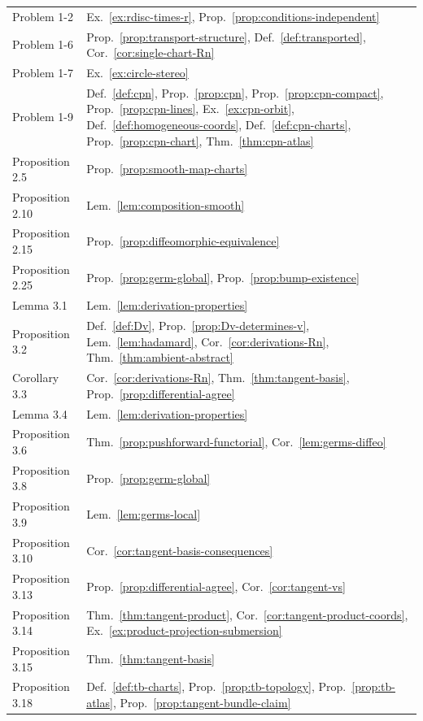 \documentclass[11pt]{report}
\begin{document}
{\begin{longtable}{>{\raggedright\arraybackslash}p{3.6cm} >{\raggedright\arraybackslash}p{11.2cm}}
Problem 1-2 & Ex.~\ref{ex:rdisc-times-r}, Prop.~\ref{prop:conditions-independent} \\
Problem 1-6 & Prop.~\ref{prop:transport-structure}, Def.~\ref{def:transported}, Cor.~\ref{cor:single-chart-Rn} \\
Problem 1-7 & Ex.~\ref{ex:circle-stereo} \\
Problem 1-9 & Def.~\ref{def:cpn}, Prop.~\ref{prop:cpn}, Prop.~\ref{prop:cpn-compact}, Prop.~\ref{prop:cpn-lines}, Ex.~\ref{ex:cpn-orbit}, Def.~\ref{def:homogeneous-coords}, Def.~\ref{def:cpn-charts}, Prop.~\ref{prop:cpn-chart}, Thm.~\ref{thm:cpn-atlas} \\
Proposition 2.5 & Prop.~\ref{prop:smooth-map-charts} \\
Proposition 2.10 & Lem.~\ref{lem:composition-smooth} \\
Proposition 2.15 & Prop.~\ref{prop:diffeomorphic-equivalence} \\
Proposition 2.25 & Prop.~\ref{prop:germ-global}, Prop.~\ref{prop:bump-existence} \\
Lemma 3.1 & Lem.~\ref{lem:derivation-properties} \\
Proposition 3.2 & Def.~\ref{def:Dv}, Prop.~\ref{prop:Dv-determines-v}, Lem.~\ref{lem:hadamard}, Cor.~\ref{cor:derivations-Rn}, Thm.~\ref{thm:ambient-abstract} \\
Corollary 3.3 & Cor.~\ref{cor:derivations-Rn}, Thm.~\ref{thm:tangent-basis}, Prop.~\ref{prop:differential-agree} \\
Lemma 3.4 & Lem.~\ref{lem:derivation-properties} \\
Proposition 3.6 & Thm.~\ref{prop:pushforward-functorial}, Cor.~\ref{lem:germs-diffeo} \\
Proposition 3.8 & Prop.~\ref{prop:germ-global} \\
Proposition 3.9 & Lem.~\ref{lem:germs-local} \\
Proposition 3.10 & Cor.~\ref{cor:tangent-basis-consequences} \\
Proposition 3.13 & Prop.~\ref{prop:differential-agree}, Cor.~\ref{cor:tangent-vs} \\
Proposition 3.14 & Thm.~\ref{thm:tangent-product}, Cor.~\ref{cor:tangent-product-coords}, Ex.~\ref{ex:product-projection-submersion} \\
Proposition 3.15 & Thm.~\ref{thm:tangent-basis} \\
Proposition 3.18 & Def.~\ref{def:tb-charts}, Prop.~\ref{prop:tb-topology}, Prop.~\ref{prop:tb-atlas}, Prop.~\ref{prop:tangent-bundle-claim} \\

\end{longtable}}
\end{document}
